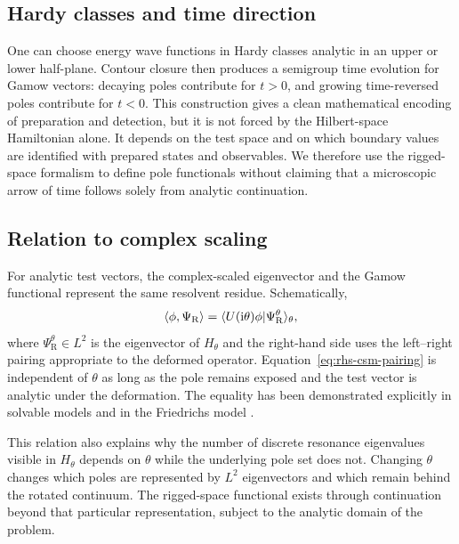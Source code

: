 \subsection{Hardy classes and time direction}
\label{subsec:hardy-time}

One can choose energy wave functions in Hardy classes analytic in an upper or
lower half-plane.  Contour closure then produces a semigroup time evolution
for Gamow vectors: decaying poles contribute for $t>0$, and growing
time-reversed poles contribute for $t<0$.  This construction gives a clean
mathematical encoding of preparation and detection, but it is not forced by
the Hilbert-space Hamiltonian alone.  It depends on the test space and on which
boundary values are identified with prepared states and observables.  We
therefore use the rigged-space formalism to define pole functionals without
claiming that a microscopic arrow of time follows solely from analytic
continuation.

\subsection{Relation to complex scaling}
\label{subsec:rhs-csm}

For analytic test vectors, the complex-scaled eigenvector and the Gamow
functional represent the same resolvent residue.  Schematically,
\begin{equation}
  \langle \phi,\Psi_{\mathrm R}\rangle
  =\langle U(\mathrm{i}\theta)\phi|
  \Psi_{\mathrm R}^{\theta} \rangle_{\theta},
  \label{eq:rhs-csm-pairing}
\end{equation}
where $\Psi_{\mathrm R}^{\theta}\in L^2$ is the eigenvector of $H_\theta$ and
the right-hand side uses the left--right pairing appropriate to the deformed
operator.  Equation~\eqref{eq:rhs-csm-pairing} is independent of $\theta$ as
long as the pole remains exposed and the test vector is analytic under the
deformation.  The equality has been demonstrated explicitly in solvable
models and in the Friedrichs model
\cite{Antoniou:2001,Morikawa:2025xjq}.

This relation also explains why the number of discrete resonance eigenvalues
visible in $H_\theta$ depends on $\theta$ while the underlying pole set does
not.  Changing $\theta$ changes which poles are represented by $L^2$
eigenvectors and which remain behind the rotated continuum.  The rigged-space
functional exists through continuation beyond that particular representation,
subject to the analytic domain of the problem.

